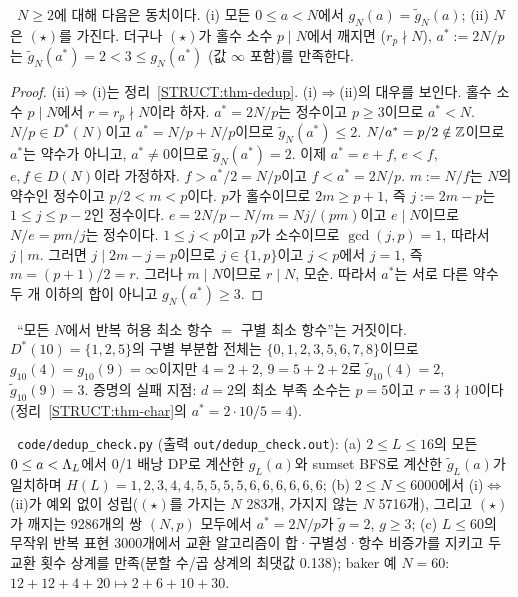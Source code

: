 \begin{theorem}\label{STRUCT:thm-char}
\PROVED\ $N\ge2$에 대해 다음은 동치이다.
(i) 모든 $0\le a<N$에서 $g_N(a)=\widetilde g_N(a)$;
(ii) $N$은 $(\star)$를 가진다.
더구나 $(\star)$가 홀수 소수 $p\mid N$에서 깨지면 ($r_p\nmid N$), $a^*:=2N/p$는 $\widetilde g_N(a^*)=2<3\le g_N(a^*)$ (값 $\infty$ 포함)를 만족한다.
\end{theorem}
\begin{proof}
(ii)$\Rightarrow$(i)는 정리~\ref{STRUCT:thm-dedup}. (i)$\Rightarrow$(ii)의 대우를 보인다. 홀수 소수 $p\mid N$에서 $r=r_p\nmid N$이라 하자.
$a^*=2N/p$는 정수이고 $p\ge3$이므로 $a^*<N$. $N/p\in D^*(N)$이고 $a^*=N/p+N/p$이므로 $\widetilde g_N(a^*)\le2$. $N/a^*=p/2\notin\mathbb{Z}$이므로 $a^*$는 약수가 아니고, $a^*\ne0$이므로 $\widetilde g_N(a^*)=2$.
이제 $a^*=e+f$, $e<f$, $e,f\in D(N)$이라 가정하자. $f>a^*/2=N/p$이고 $f<a^*=2N/p$. $m:=N/f$는 $N$의 약수인 정수이고 $p/2<m<p$이다. $p$가 홀수이므로 $2m\ge p+1$, 즉 $j:=2m-p$는 $1\le j\le p-2$인 정수이다.
$e=2N/p-N/m=N j/(pm)$이고 $e\mid N$이므로 $N/e=pm/j$는 정수이다. $1\le j<p$이고 $p$가 소수이므로 $\gcd(j,p)=1$, 따라서 $j\mid m$. 그러면 $j\mid 2m-j=p$이므로 $j\in\{1,p\}$이고 $j<p$에서 $j=1$, 즉 $m=(p+1)/2=r$. 그러나 $m\mid N$이므로 $r\mid N$, 모순. 따라서 $a^*$는 서로 다른 약수 두 개 이하의 합이 아니고 $g_N(a^*)\ge3$.
\end{proof}

\begin{counterexample}[$N=10$, $a=4$]\label{STRUCT:cex-10}
\REFUTED\ ``모든 $N$에서 반복 허용 최소 항수 $=$ 구별 최소 항수''는 거짓이다.
$D^*(10)=\{1,2,5\}$의 구별 부분합 전체는 $\{0,1,2,3,5,6,7,8\}$이므로 $g_{10}(4)=g_{10}(9)=\infty$이지만 $4=2+2$, $9=5+2+2$로 $\widetilde g_{10}(4)=2$, $\widetilde g_{10}(9)=3$.
증명의 실패 지점: $d=2$의 최소 부족 소수는 $p=5$이고 $r=3\nmid 10$이다(정리~\ref{STRUCT:thm-char}의 $a^*=2\cdot10/5=4$).
\end{counterexample}

\begin{remark}[수치 확인]\label{STRUCT:rem-num-dedup}
\NUMERIC\ \texttt{code/dedup\_check.py} (출력 \texttt{out/dedup\_check.out}):
(a) $2\le L\le16$의 모든 $0\le a<\Lambda_L$에서 0/1 배낭 DP로 계산한 $g_L(a)$와 sumset BFS로 계산한 $\widetilde g_L(a)$가 일치하며 $H(L)=1,2,3,4,4,5,5,5,5,6,6,6,6,6,6$;
(b) $2\le N\le6000$에서 (i)$\Leftrightarrow$(ii)가 예외 없이 성립($(\star)$를 가지는 $N$ 283개, 가지지 않는 $N$ 5716개), 그리고 $(\star)$가 깨지는 9286개의 쌍 $(N,p)$ 모두에서 $a^*=2N/p$가 $\widetilde g=2$, $g\ge3$;
(c) $L\le60$의 무작위 반복 표현 3000개에서 교환 알고리즘이 합·구별성·항수 비증가를 지키고 두 교환 횟수 상계를 만족(분할 수/곱 상계의 최댓값 0.138);
baker 예 $N=60$: $12+12+4+20\mapsto 2+6+10+30$.
\end{remark}


